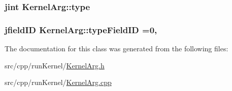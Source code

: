 \hypertarget{class_kernel_arg_ab559d267fed499ad291ddd9b4596dd72}{
\subsubsection[{type}]{\setlength{\rightskip}{0pt plus 5cm}jint Kernel\-Arg\-::type}}\label{class_kernel_arg_ab559d267fed499ad291ddd9b4596dd72}
\hypertarget{class_kernel_arg_a855049c3bb75ae01b1b7657735f91787}{
\subsubsection[{type\-Field\-I\-D}]{\setlength{\rightskip}{0pt plus 5cm}jfield\-I\-D Kernel\-Arg\-::type\-Field\-I\-D =0\hspace{0.3cm}{\ttfamily [static]}, {\ttfamily [private]}}}\label{class_kernel_arg_a855049c3bb75ae01b1b7657735f91787}


The documentation for this class was generated from the following files\-:\begin{DoxyCompactItemize}
\item 
src/cpp/run\-Kernel/\hyperlink{_kernel_arg_8h}{Kernel\-Arg.\-h}\item 
src/cpp/run\-Kernel/\hyperlink{_kernel_arg_8cpp}{Kernel\-Arg.\-cpp}\end{DoxyCompactItemize}
